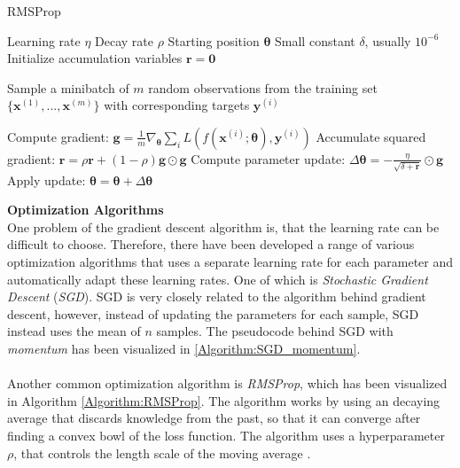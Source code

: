 \documentclass[./main.tex]{subfiles}
\begin{document}
\begin{algorithm}[htbp]
    \caption{RMSProp \cite{DeepLearning}}
    \label{Algorithm:RMSProp}
    \begin{algorithmic}[1]
        \Require Learning rate $\eta$
        \Require Decay rate $\rho$
        \Require Starting position $\bm{\theta}$
        \Require Small constant $\delta$, usually $10^{-6}$
        \State Initialize accumulation variables $\bm{r} = \bm{0}$
            \State \begin{varwidth}[t]{\linewidth}
            Sample a minibatch of $m$ random observations from the training set $\{\bm{x}^{(1)}, ..., \bm{x}^{(m)}\}$ with corresponding targets $\bm{y}^{(i)}$
            \end{varwidth}
            \State Compute gradient: $\bm{g} = \frac{1}{m} \nabla_{\bm{\theta}} \sum_i L\left( f \left(\bm{x}^{(i)}; \bm{\theta} \right), \bm{y}^{(i)} \right)$
            \State Accumulate squared gradient: $\bm{r} = \rho \bm{r} + (1 - \rho) \bm{g} \odot \bm{g}$
            \State Compute parameter update: $\Delta\bm{\theta} = - \frac{\eta}{\sqrt{\delta + \bm{r}}} \odot \bm{g}$
            \State Apply update: $\bm{\theta} = \bm{\theta} + \Delta \bm{\theta}$ 
        \EndWhile
    \end{algorithmic}
\end{algorithm}
\noindent \textbf{Optimization Algorithms} \\
\noindent One problem of the gradient descent algorithm is, that the learning rate can be difficult to choose. Therefore, there have been developed a range of various optimization algorithms that uses a separate learning rate for each parameter and automatically adapt these learning rates. One of which is \textit{Stochastic Gradient Descent} (\textit{SGD}). SGD is very closely related to the algorithm behind gradient descent, however, instead of updating the parameters for each sample, SGD instead uses the mean of $n$ samples. The pseudocode behind SGD with \textit{momentum} has been visualized in \ref{Algorithm:SGD_momentum}.
\\
\\
Another common optimization algorithm is \textit{RMSProp}, which has been visualized in Algorithm \ref{Algorithm:RMSProp}. The algorithm works by using an decaying average that discards knowledge from the past, so that it can converge after finding a convex bowl of the loss function. The algorithm uses a hyperparameter $\rho$, that controls the length scale of the moving average \cite{DeepLearning}.
\end{document}
